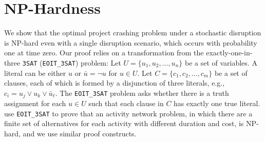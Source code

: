 \documentclass[11pt]{article}
\begin{document}
\section{NP-Hardness} \label{sec:nphard}
	We show that the optimal project crashing problem under a stochastic disruption is NP-hard even with a single disruption scenario, which occurs with probability one at time zero.
	Our proof relies on a transformation from the exactly-one-in-three \verb|3SAT| (\verb|EOIT_3SAT|) problem: Let \(U = \{u_1,u_2, \dots, u_n\}\) be a set of variables. A literal can be either \(u\) or \(\bar{u} = \neg u\) for \(u \in U\). Let \(C = \{c_1, c_2, \dots, c_m\}\) be a set of clauses, each of which is formed by a disjunction of three literals, e.g., \(c_i = u_j \vee u_k \vee \bar{u}_{\ell}\). The \verb|EOIT_3SAT| problem asks whether there is a truth assignment for each \(u \in U\) such that each clause in \(C\) has exactly one true literal. \citet{de1997complexity} use \verb|EOIT_3SAT| to prove that an activity network problem, in which there are a finite set of alternatives for each activity with different duration and cost, is NP-hard, and we use similar proof constructs. 
\end{document}

